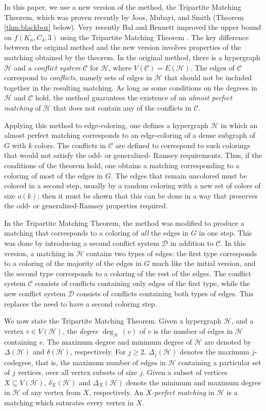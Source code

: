 \documentclass{article}
\theoremstyle{definition}
\newcommand\cH{{\mathcal H}}
\newcommand\cC{{\mathcal C}}
\newcommand{\cD}{\mathcal{D}}
\begin{document}
In this paper, we use a new version of the method, the Tripartite Matching Theorem, which was proven recently by Joos, Mubayi, and Smith \cite{JMS} (Theorem \ref{thm:blackbox} below). Very recently Bal and Bennett improved the upper bound on $f(K_n, C_4,3)$ using the Tripartite Matching Theorem \cite{bb-25}. The key difference between the original method and the new version involves properties of the matching obtained by the theorem. In the original method, there is a hypergraph $\cH$ and a {\em conflict system} $\cC$ for $\cH$, where $V(\cC) = E(\cH)$. The edges of $\cC$ correspond to \emph{conflicts}, namely sets of edges in $\cH$ that should not be included together in the resulting matching. As long as some conditions on the degrees in $\cH$ and $\cC$ hold, the method guarantees the existence of an \emph{almost perfect matching} of $\cH$ that does not contain any of the conflicts in $\cC$. 

Applying this method to edge-coloring, one defines a hypergraph $\cH$ in which an almost perfect matching corresponds to an edge-coloring of a dense subgraph of $G$ with $k$ colors. The conflicts in $\cC$ are defined to correspond to such colorings that would not satisfy the odd- or generalized- Ramsey requirements. Thus, if the conditions of the theorem hold, one obtains a matching corresponding to a coloring of most of the edges in $G$. The edges that remain uncolored must be colored in a second step, usually by a random coloring with a new set of colors of size $o(k)$; then it must be shown that this can be done in a way that preserves the odd- or generalized-Ramsey properties required. 

In the Tripartite Matching Theorem, the method was modified to produce a matching that corresponds to a coloring of {\em all} the edges in $G$ in one step. 
  This was done by introducing a second conflict system $\cD$ in addition to $\cC$. In this version,  a matching in $\cH$ contains two types of edges: the first type corresponds to a coloring of the majority of the edges in $G$ much like the initial version, and the second type corresponds to a coloring of the rest of the edges. The conflict system $\cC$ consists of conflicts containing only edges of the first type, while the new conflict system $\cD$ consists of conflicts containing both types of edges. This replaces the need to have a second coloring step. 


We now state the Tripartite Matching Theorem.
Given a hypergraph $\cH$, and a vertex $v \in V(\cH)$, the  \emph{degree} $\deg_\cH(v)$ of $v$ is the number of edges in $\cH$ containing $v$.  
The maximum degree and minimum degree of $\cH$ are denoted by $\Delta(\cH)$ and $\delta(\cH)$, respectively.  For $j \geq 2$, $\Delta_j(\cH)$ denotes the maximum $j$-codegree, that is, the maximum number of edges in $\cH$ containing a particular set of $j$ vertices, over all vertex subsets of size $j$. Given a subset of vertices $X\subseteq V(\mathcal{H})$, $\delta_X(\mathcal{H})$ and $\Delta_X(\mathcal{H})$ denote the minimum and maximum degree in $\mathcal{H}$ of any vertex from $X$, respectively. An \textit{$X$-perfect matching} in $\mathcal{H}$ is a matching which saturates every vertex in $X$.
\end{document}

